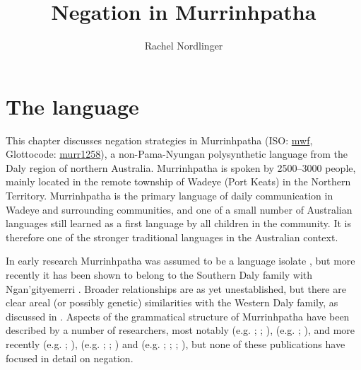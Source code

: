 \documentclass[output=paper,colorlinks,citecolor=brown]{langscibook}
\author{Rachel Nordlinger\affiliation{University of Melbourne}}
\title{Negation in Murrinhpatha}
\begin{document}
\maketitle 

\section{The language} \label{sec:mur:1}

This chapter discusses negation strategies in Murrinhpatha (ISO: \href{https://iso639-3.sil.org/code/mwf}{mwf}, Glottocode: \href{https://glottolog.org/resource/languoid/id/murr1258}{murr1258}), a non-Pama-Nyungan polysynthetic language from the Daly region of northern Australia. Murrinhpatha is spoken by 2500–3000 people, mainly located in the remote township of Wadeye (Port Keats) in the Northern Territory. Murrinhpatha is the primary language of daily communication in Wadeye and surrounding communities, and one of a small number of Australian languages still learned as a first language by all children in the community. It is therefore one of the stronger traditional languages in the Australian context. 

In early research Murrinhpatha was assumed to be a language isolate \citep{Tryon1974}, but more recently it has been shown to belong to the Southern Daly family with Ngan’gityemerri \citep{Green2003}. Broader relationships are as yet unestablished, but there are clear areal (or possibly genetic) similarities with the Western Daly family, as discussed in \citet{Nordlinger2017}. Aspects of the grammatical structure of Murrinhpatha have been described by a number of researchers, most notably \citeauthor{Walsh1976} (e.g. \citeyear{Walsh1976}; \citeyear{Walsh1996}; \citeyear{Walsh1997}), \citeauthor{Street1987} (e.g. \citeyear{Street1987}; \citeyear{Street1996}), and more recently \citeauthor{Blythe2009} (e.g. \citeyear{Blythe2009}; \citeyear{Blythe2013}), \citeauthor{Mansfield2014} (e.g. \citeyear{Mansfield2014}; \citeyear{Mansfield2016}; \citeyear{Mansfield2019}) and \citeauthor{Nordlinger2010} (e.g. \citeyear{Nordlinger2010}; \citeyear{Nordlinger2011}; \citeyear{Nordlinger2015}; \citeyear{Nordlinger2017}), but none of these publications have focused in detail on negation. 
\end{document}
